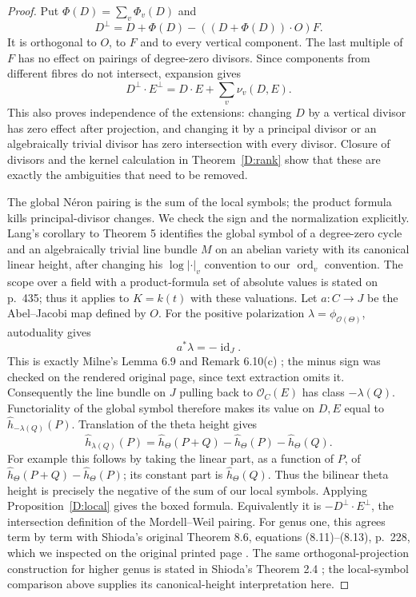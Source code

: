 \begin{proof}
Put $\Phi(D)=\sum_v\Phi_v(D)$ and
\[
 D^\perp=D+\Phi(D)-((D+\Phi(D))\cdot O)F.
\]
It is orthogonal to $O$, to $F$ and to every vertical component.  The
last multiple of $F$ has no effect on pairings of degree-zero divisors.
Since components from different fibres do not intersect, expansion gives
\[
 D^\perp\cdot E^\perp
       =D\cdot E+\sum_v\nu_v(D,E).
\]
This also proves independence of the extensions: changing $D$ by a
vertical divisor has zero effect after projection, and changing it by
a principal divisor or an algebraically trivial divisor has zero
intersection with every divisor.  Closure of divisors and the kernel
calculation in Theorem~\ref{D:rank} show that these are exactly the
ambiguities that need to be removed.

The global N\'eron pairing is the sum of the local symbols; the product
formula kills principal-divisor changes.  We check the sign and the
normalization explicitly.  Lang's corollary to Theorem 5
\cite[p.~441]{LangHeights1964} identifies the global symbol of a
degree-zero cycle and an algebraically trivial line bundle $M$ on an
abelian variety with its canonical linear height, after changing his
$\log|\cdot|_v$ convention to our $\operatorname{ord}_v$ convention.
The scope over a field with a product-formula set of absolute values is
stated on p.~435; thus it applies to $K=k(t)$ with these valuations.
Let $a:C\to J$ be the Abel--Jacobi map defined by $O$.  For the positive
polarization $\lambda=\phi_{\mathcal O(\Theta)}$, autoduality gives
\[
             a^*\lambda=-\operatorname{id}_J.
\]
This is exactly Milne's Lemma 6.9 and Remark 6.10(c)
\cite[p.~23]{MilneJV}; the minus sign was checked on the rendered original
page, since text extraction omits it.  Consequently the line bundle on
$J$ pulling back to $\mathcal O_C(E)$ has class $-\lambda(Q)$.
Functoriality of the global symbol therefore makes its value on $D,E$
equal to $\widehat h_{-\lambda(Q)}(P)$.  Translation of the theta height
gives
\[
 \widehat h_{\lambda(Q)}(P)
  =\widehat h_\Theta(P+Q)-\widehat h_\Theta(P)-\widehat h_\Theta(Q).
\]
For example this follows by taking the linear part, as a function of
$P$, of $\widehat h_\Theta(P+Q)-\widehat h_\Theta(P)$; its constant part
is $\widehat h_\Theta(Q)$.  Thus the bilinear theta height is precisely
the negative of the sum of our local symbols.  Applying
Proposition~\ref{D:local} gives the boxed formula.
Equivalently it is $-D^\perp\cdot E^\perp$, the
intersection definition of the Mordell--Weil pairing.  For genus one,
this agrees term by term with Shioda's original Theorem 8.6,
equations (8.11)--(8.13), p.~228, which we inspected on the original
printed page \cite{Shioda1990}.  The same orthogonal-projection
construction for higher genus is stated in Shioda's Theorem 2.4
\cite[p.~248]{Shioda1992}; the local-symbol comparison above supplies its
canonical-height interpretation here.


\end{proof}
